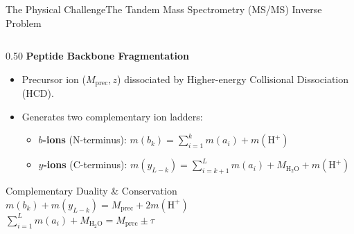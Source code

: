 \documentclass[aspectratio=169, 10pt]{beamer}
\begin{document}
\begin{frame}{The Physical Challenge}{The Tandem Mass Spectrometry (MS/MS) Inverse Problem}
\begin{columns}[T]
\begin{column}{0.50\textwidth}
  \textbf{\footnotesize Peptide Backbone Fragmentation}
  \begin{itemize}\setlength{\itemsep}{2pt}\scriptsize
    \item Precursor ion ($M_{\text{prec}}, z$) dissociated by Higher-energy Collisional Dissociation (HCD).
    \item Generates two complementary ion ladders:
    \begin{itemize}\scriptsize
      \item \textbf{$b$-ions} (N-terminus): $m(b_k) = \sum_{i=1}^k m(a_i) + m(\text{H}^+)$
      \item \textbf{$y$-ions} (C-terminus): $m(y_{L-k}) = \sum_{i=k+1}^L m(a_i) + M_{\text{H}_2\text{O}} + m(\text{H}^+)$
    \end{itemize}
  \end{itemize}
  \vspace{0.1cm}
  \begin{block}{\scriptsize Complementary Duality \& Conservation}
    \scriptsize
    $m(b_k) + m(y_{L-k}) = M_{\text{prec}} + 2m(\text{H}^+)$\\
    $\sum_{i=1}^L m(a_i) + M_{\text{H}_2\text{O}} = M_{\text{prec}} \pm \tau$
  \end{block}
\end{column}


\end{columns}
\end{frame}
\end{document}
